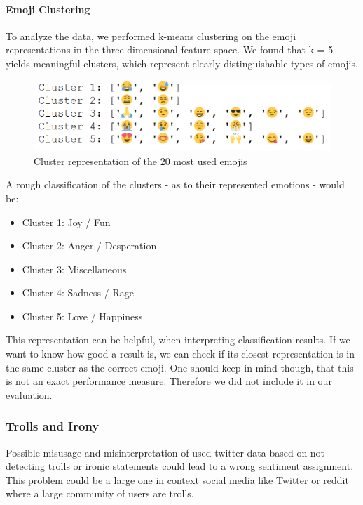 \documentclass{article}
\begin{document}
\paragraph{Emoji Clustering}
\label{clustering}
To analyze the data, we performed k-means clustering on the emoji representations in the three-dimensional feature space. We found that k = 5 yields meaningful clusters, which represent clearly distinguishable types of emojis.
\begin{figure}[h!]
\centering
\includegraphics[scale=0.45]{images/clusters}
\caption{Cluster representation of the 20 most used emojis}
\label{fig:clusters}
\end{figure}
A rough classification of the clusters - as to their represented emotions - would be:
\begin{itemize}
    \item Cluster 1: Joy / Fun 
    \item Cluster 2: Anger / Desperation
    \item Cluster 3: Miscellaneous
    \item Cluster 4: Sadness / Rage
    \item Cluster 5: Love / Happiness
\end{itemize}
This representation can be helpful, when interpreting classification results. If we want to know how good a result is, we can check if its closest representation is in the same cluster as the correct emoji. One should keep in mind though, that this is not an exact performance measure. Therefore we did not include it in our evaluation.

\subsubsection{Trolls and Irony}
Possible misusage and misinterpretation of used twitter data based on not detecting trolls or ironic statements could lead to a wrong sentiment assignment. This problem could be a large one in context social media like Twitter or reddit where a large community of users are trolls.



\end{document}
